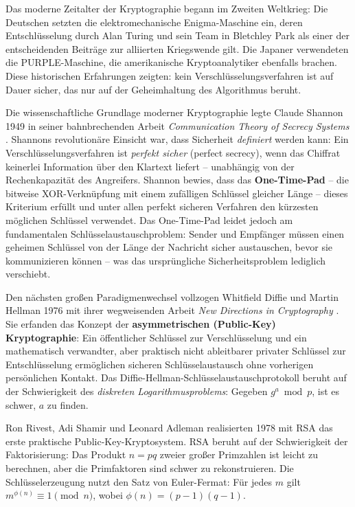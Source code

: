 ﻿\documentclass[a4paper,12pt]{scrreprt}
\theoremstyle{definition}
\begin{document}
Das moderne Zeitalter der Kryptographie begann im Zweiten Weltkrieg: Die Deutschen setzten die elektromechanische Enigma-Maschine ein, deren Entschlüsselung durch Alan Turing und sein Team in Bletchley Park als einer der entscheidenden Beiträge zur alliierten Kriegswende gilt. Die Japaner verwendeten die PURPLE-Maschine, die amerikanische Kryptoanalytiker ebenfalls brachen. Diese historischen Erfahrungen zeigten: kein Verschlüsselungsverfahren ist auf Dauer sicher, das nur auf der Geheimhaltung des Algorithmus beruht.

Die wissenschaftliche Grundlage moderner Kryptographie legte Claude Shannon 1949 in seiner bahnbrechenden Arbeit \textit{Communication Theory of Secrecy Systems} \cite{Sha49}. Shannons revolutionäre Einsicht war, dass Sicherheit \emph{definiert} werden kann: Ein Verschlüsselungsverfahren ist \emph{perfekt sicher} (perfect secrecy), wenn das Chiffrat keinerlei Information über den Klartext liefert -- unabhängig von der Rechenkapazität des Angreifers. Shannon bewies, dass das \textbf{One-Time-Pad} \cite{Ver26} -- die bitweise XOR-Verknüpfung mit einem zufälligen Schlüssel gleicher Länge -- dieses Kriterium erfüllt und unter allen perfekt sicheren Verfahren den kürzesten möglichen Schlüssel verwendet. Das One-Time-Pad leidet jedoch am fundamentalen Schlüsselaustauschproblem: Sender und Empfänger müssen einen geheimen Schlüssel von der Länge der Nachricht sicher austauschen, bevor sie kommunizieren können -- was das ursprüngliche Sicherheitsproblem lediglich verschiebt.

Den nächsten großen Paradigmenwechsel vollzogen Whitfield Diffie und Martin Hellman 1976 mit ihrer wegweisenden Arbeit \textit{New Directions in Cryptography} \cite{DH76}. Sie erfanden das Konzept der \textbf{asymmetrischen (Public-Key) Kryptographie}: Ein öffentlicher Schlüssel zur Verschlüsselung und ein mathematisch verwandter, aber praktisch nicht ableitbarer privater Schlüssel zur Entschlüsselung ermöglichen sicheren Schlüsselaustausch ohne vorherigen persönlichen Kontakt. Das Diffie-Hellman-Schlüsselaustauschprotokoll beruht auf der Schwierigkeit des \emph{diskreten Logarithmusproblems}: Gegeben $g^a \bmod p$, ist es schwer, $a$ zu finden.

Ron Rivest, Adi Shamir und Leonard Adleman realisierten 1978 mit RSA \cite{Riv78} das erste praktische Public-Key-Kryptosystem. RSA beruht auf der Schwierigkeit der Faktorisierung: Das Produkt $n = pq$ zweier großer Primzahlen ist leicht zu berechnen, aber die Primfaktoren sind schwer zu rekonstruieren. Die Schlüsselerzeugung nutzt den Satz von Euler-Fermat: Für jedes $m$ gilt $m^{\phi(n)} \equiv 1 \pmod{n}$, wobei $\phi(n) = (p-1)(q-1)$.
\end{document}

